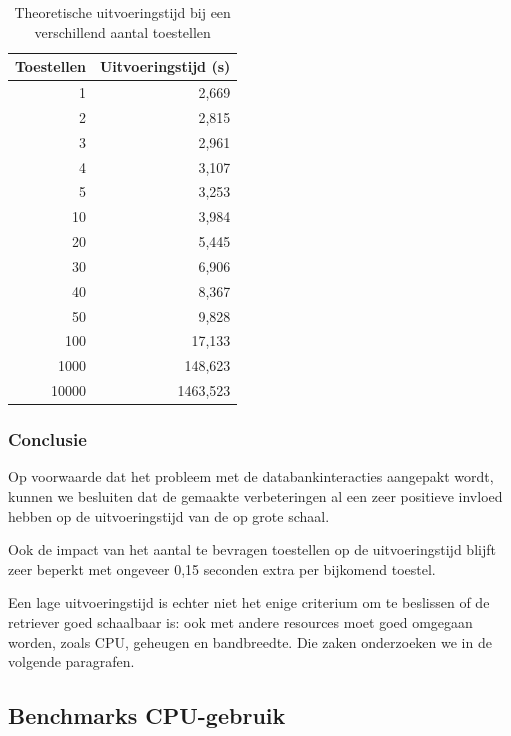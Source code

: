 \begin{table}[h]
\centering
\begin{tabular}{@{}rr@{}}
\toprule
Toestellen & Uitvoeringstijd (s) \\ \midrule
1          & 2,669               \\
2          & 2,815               \\
3          & 2,961               \\
4          & 3,107               \\
5          & 3,253               \\
10         & 3,984               \\
20         & 5,445               \\
30         & 6,906               \\
40         & 8,367               \\
50         & 9,828               \\
100        & 17,133              \\
1000       & 148,623             \\
10000      & 1463,523            \\ \bottomrule
\end{tabular}
\caption{Theoretische uitvoeringstijd bij een verschillend aantal toestellen}
\label{tabel-theoretische-uitvoeringstijd}
\end{table}

\subsubsection{Conclusie}

Op voorwaarde dat het probleem met de databankinteracties aangepakt wordt, kunnen we besluiten dat de gemaakte verbeteringen
al een zeer positieve invloed hebben op de uitvoeringstijd van de \nwmretriever{} op grote schaal.

Ook de impact van het aantal te bevragen toestellen op de uitvoeringstijd blijft zeer beperkt met ongeveer 0,15 seconden extra per bijkomend toestel.

Een lage uitvoeringstijd is echter niet het enige criterium om te beslissen of de retriever goed schaalbaar is:
ook met andere resources moet goed omgegaan worden, zoals CPU, geheugen en bandbreedte.
Die zaken onderzoeken we in de volgende paragrafen.


\subsection{Benchmarks CPU-gebruik}
\label{cpu-gebruik}

